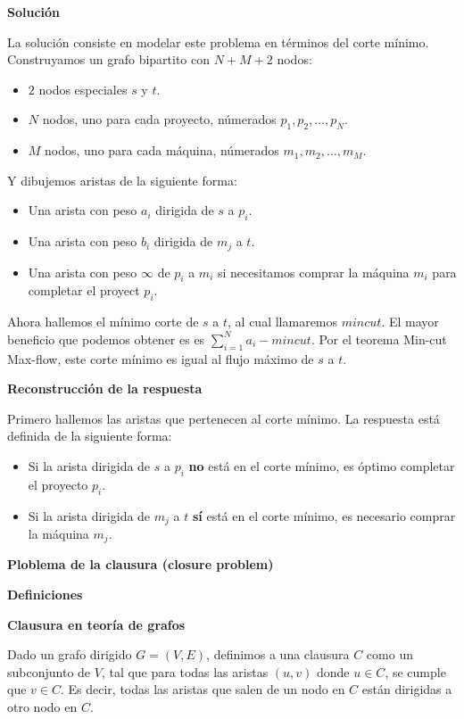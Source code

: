 {  \textbf{Solución}

  La solución consiste en modelar este problema en términos del corte mínimo.
  Construyamos un grafo bipartito con $N+M+2$ nodos:

  \begin{itemize}
    \item $2$ nodos especiales $s$ y $t$.
    \item $N$ nodos, uno para cada proyecto, númerados $p_1, p_2, \dots, p_N$.
    \item $M$ nodos, uno para cada máquina, númerados $m_1, m_2, \dots, m_M$.
  \end{itemize}

Y dibujemos aristas de la siguiente forma:

\begin{itemize}
  \item Una arista con peso $a_i$ dirigida de $s$ a $p_i$.
  \item Una arista con peso $b_i$ dirigida de $m_j$ a $t$.
  \item Una arista con peso $\infty$ de $p_i$ a $m_i$ si necesitamos comprar
    la máquina $m_i$ para completar el proyect $p_i$.
\end{itemize}

  Ahora hallemos el mínimo corte de $s$ a $t$, al cual llamaremos $mincut$. El
  mayor beneficio que podemos obtener es es $\sum_{i=1}^{N}a_i-mincut$. Por el
  teorema Min-cut Max-flow, este corte mínimo es igual al flujo máximo de
  $s$ a $t$.

\textbf{Reconstrucción de la respuesta}

  Primero hallemos las aristas que pertenecen al corte mínimo. La respuesta está definida de la siguiente forma:
  \begin{itemize}
    \item Si la arista dirigida de $s$ a $p_i$ \textbf{no} está en el corte mínimo, es óptimo completar el proyecto $p_i$.
    \item Si la arista dirigida de $m_j$ a $t$ \textbf{sí} está en el corte mínimo, es necesario comprar la máquina $m_j$.
  \end{itemize}

  \textbf{Ploblema de la clausura (closure problem)}

  \textbf{Definiciones}

  \textbf{Clausura en teoría de grafos}

    Dado un grafo dirigido $G=(V,E)$, definimos a una clausura $C$ como un
    subconjunto de $V$, tal que para todas las aristas $(u,v)$ donde
    $u \in C$, se cumple que $v \in C$. Es decir, todas las aristas que salen
    de un nodo en $C$ están dirigidas a otro nodo en $C$.

}

